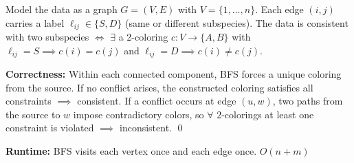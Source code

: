 \documentclass[11pt]{article}
\begin{document}
Model the data as a graph $G = (V, E)$ with $V = \{1, \ldots, n\}$. Each edge $(i, j)$ carries a label $\ell_{ij} \in \{S, D\}$ (same or different subspecies). The data is consistent with two subspecies $\iff$ $\exists$ a 2-coloring $c : V \to \{A, B\}$ with $\ell_{ij} = S \implies c(i) = c(j)$ and $\ell_{ij} = D \implies c(i) \ne c(j)$.

\begin{algorithm}[H]
\DontPrintSemicolon
{}
\end{algorithm}

\textbf{Correctness:}
Within each connected component, BFS forces a unique coloring from the source. If no conflict arises, the constructed coloring satisfies all constraints $\implies$ consistent. If a conflict occurs at edge $(u, w)$, two paths from the source to $w$ impose contradictory colors, so $\forall$ 2-colorings at least one constraint is violated $\implies$ inconsistent. \qed

\textbf{Runtime:} BFS visits each vertex once and each edge once. $\boxed{O(n + m)}$
\end{document}
